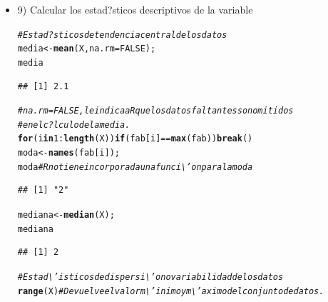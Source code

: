 \documentclass[12pt,letterpaper]{article}\usepackage[]{graphicx}\usepackage[]{color}
\makeatletter
\newcommand{\hlnum}[1]{\textcolor[rgb]{0.686,0.059,0.569}{#1}}%
\newcommand{\hlcom}[1]{\textcolor[rgb]{0.678,0.584,0.686}{\textit{#1}}}%
\newcommand{\hlopt}[1]{\textcolor[rgb]{0,0,0}{#1}}%
\newcommand{\hlstd}[1]{\textcolor[rgb]{0.345,0.345,0.345}{#1}}%
\newcommand{\hlkwa}[1]{\textcolor[rgb]{0.161,0.373,0.58}{\textbf{#1}}}%
\newcommand{\hlkwb}[1]{\textcolor[rgb]{0.69,0.353,0.396}{#1}}%
\newcommand{\hlkwc}[1]{\textcolor[rgb]{0.333,0.667,0.333}{#1}}%
\newcommand{\hlkwd}[1]{\textcolor[rgb]{0.737,0.353,0.396}{\textbf{#1}}}%
\newenvironment{kframe}{%
 \def\at@end@of@kframe{}%
 \ifinner\ifhmode%
  \def\at@end@of@kframe{\end{minipage}}%
  \begin{minipage}{\columnwidth}%
 \fi\fi%
 \def\FrameCommand##1{\hskip\@totalleftmargin \hskip-\fboxsep
 \colorbox{shadecolor}{##1}\hskip-\fboxsep
     \hskip-\linewidth \hskip-\@totalleftmargin \hskip\columnwidth}%
 \MakeFramed {\advance\hsize-\width
   \@totalleftmargin\z@ \linewidth\hsize
   \@setminipage}}%
 {\par\unskip\endMakeFramed%
 \at@end@of@kframe}
\newenvironment{knitrout}{}{} %
\makeatother
\begin{document}
\begin {itemize}
\begin{knitrout}
\begin{kframe}
\begin{verbatim}
## 3 2  10 0.333  20 0.667
## 4 3   6 0.200  26 0.867
## 5 4   3 0.100  29 0.967
## 6 5   1 0.033  30 1.000
\end{verbatim}
\begin{alltt}
\hlcom{# Note que el cuadro resultante no tiene la presentaci\textbackslash{}'on deseada para }
\hlcom{# presentarla en un informe. Sin embargo, si estamos utilizando LATEX }
\hlcom{# podemos utilizar la siguiente instrucci\textbackslash{}'on xtable(tfre) y con esto nos }
\hlcom{# genera el c\textbackslash{}'odigo correspondiente para incorporarlo en nuestro archivo.}
\end{alltt}
\end{kframe}
\end{knitrout}
\item 9) Calcular los estad?sticos descriptivos de la variable
\begin{knitrout}
\color{fgcolor}\begin{kframe}
\begin{alltt}
\hlcom{# Estad?sticos de tendencia central de los datos}
\hlstd{media} \hlkwb{<-} \hlkwd{mean}\hlstd{(X,} \hlkwc{na.rm} \hlstd{=} \hlnum{FALSE}\hlstd{);}
\hlstd{media}
\end{alltt}
\begin{verbatim}
## [1] 2.1
\end{verbatim}
\begin{alltt}
\hlcom{# na.rm = FALSE, le indica a R que los datos faltantes son omitidos }
\hlcom{# en el c?lculo de la media.}
\hlkwa{for}\hlstd{(i} \hlkwa{in} \hlnum{1}\hlopt{:}\hlkwd{length}\hlstd{(X))} \hlkwa{if} \hlstd{(fab[i]} \hlopt{==} \hlkwd{max}\hlstd{(fab))} \hlkwa{break}\hlstd{()}
\hlstd{moda} \hlkwb{<-} \hlkwd{names}\hlstd{(fab[i]);}
\hlstd{moda} \hlcom{# R no tiene incorporada una funci\textbackslash{}'on para la moda}
\end{alltt}
\begin{verbatim}
## [1] "2"
\end{verbatim}
\begin{alltt}
\hlstd{mediana} \hlkwb{<-} \hlkwd{median}\hlstd{(X);}
\hlstd{mediana}
\end{alltt}
\begin{verbatim}
## [1] 2
\end{verbatim}
\begin{alltt}
\hlcom{# Estad\textbackslash{}'isticos de dispersi\textbackslash{}'on o variabilidad de los datos}
\hlkwd{range}\hlstd{(X)} \hlcom{# Devuelve el valor m\textbackslash{}'inimo y m\textbackslash{}'aximo del conjunto de datos.}

\end{alltt}
\end{kframe}
\end{knitrout}
\end{itemize}
\end{document}
